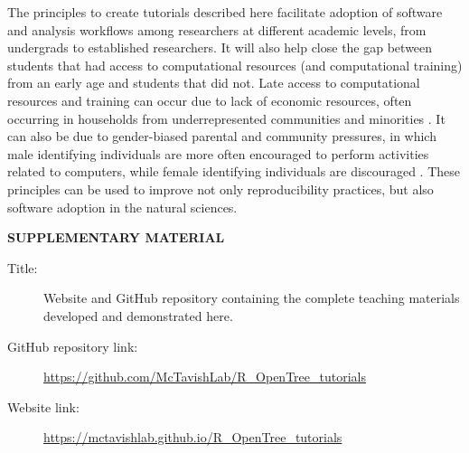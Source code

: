\documentclass[12pt]{article}
\begin{document}
The principles to create tutorials described here facilitate adoption of software and analysis workflows among researchers at different academic levels, from undergrads to established researchers.
It will also help close the gap between students that had access to computational resources (and computational training) from an early age and students that did not.
Late access to computational resources and training can occur due to lack of economic resources, often occurring in households from underrepresented communities and minorities \citep{google2016diversity, warner2021quantifying}.
It can also be due to gender-biased parental and community pressures, in which male identifying individuals are more often encouraged to perform activities related to computers, while female identifying individuals are discouraged \citep{warner2021quantifying}.
These principles can be used to improve not only reproducibility practices, but also software adoption in the natural sciences.


\bigskip
\begin{center}
{\large\bf SUPPLEMENTARY MATERIAL}
\end{center}

\begin{description}

\item[Title:] Website and GitHub repository containing the complete teaching materials developed and demonstrated here.

\item[GitHub repository link:] \url{https://github.com/McTavishLab/R_OpenTree_tutorials}

\item[Website link:] \url{https://mctavishlab.github.io/R_OpenTree_tutorials}

\end{description}


\end{document}
